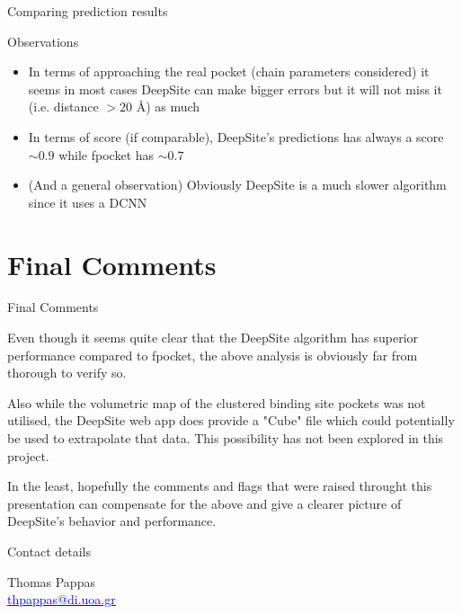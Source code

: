 \documentclass{beamer}
\newcommand{\link}[2]{\href{#1}{\textcolor{blue}{\underline{#2}}}}
\begin{document}
\begin{frame}{Comparing prediction results}
  \begin{block}{Observations}
    \begin{itemize}
      \item In terms of approaching the real pocket (chain parameters considered) it seems in most cases DeepSite can make bigger errors but it will not miss it (i.e. distance $> 20$ \AA) as much
      \item In terms of score (if comparable), DeepSite's predictions has always a score $\sim 0.9$ while fpocket has $\sim 0.7$
      \item (And a general observation) Obviously DeepSite is a much slower algorithm since it uses a DCNN
    \end{itemize}
  \end{block}
\end{frame}

\section{Final Comments}

\begin{frame}{Final Comments}
  \begin{block}{}
    Even though it seems quite clear that the DeepSite algorithm has superior performance compared to fpocket, the above analysis is obviously far from thorough to verify so.
    
    Also while the volumetric map of the clustered binding site pockets was not utilised, the DeepSite web app does provide a "Cube" file which could potentially be used to extrapolate that data.
    This possibility has not been explored in this project.
    
    In the least, hopefully the comments and flags that were raised throught this presentation can compensate for the above and give a clearer picture of DeepSite's behavior and performance.
  \end{block}
\end{frame}

\begin{frame}{Contact details}
  \begin{center}
    Thomas Pappas\\
    \link{mailto:thpappas@di.uoa.gr}{thpappas@di.uoa.gr}
  \end{center}
\end{frame}
\end{document}
